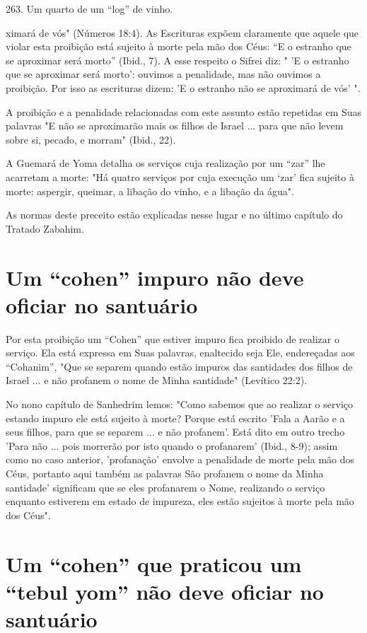 263. Um quarto de um ``log'' de vinho.


ximará de vós" (Números 18:4). As Escrituras expõem claramente que
aquele que violar esta proibição está sujeito à morte pela mão dos Céus:
``E o estranho que se aproximar será morto'' (Ibid., 7). A esse respeito o
Sifrei diz: " 'E o es­tranho que se aproximar será morto': ouvimos a
penalidade, mas não ouvimos a proibição. Por isso as escrituras dizem:
'E o estranho não se aproximará de vós' ".

A proibição e a penalidade relacionadas com este assunto estão
re­petidas em Suas palavras "E não se aproximarão mais os filhos de
Israel ... para que não levem sobre si, pecado, e morram" (Ibid., 22).

A Guemará de Yoma detalha os serviços cuja realização por um ``zar'' lhe
acarretam a morte: "Há quatro serviços por cuja execução um `zar' fica
su­jeito à morte: aspergir, queimar, a libação do vinho, e a libação da
água".

As normas deste preceito estão explicadas nesse lugar e no último
capítulo do Tratado Zabahim.


\section{Um ``cohen'' impuro não deve oficiar no santuário}


Por esta proibição um ``Cohen'' que estiver impuro fica proibido de
realizar o serviço. Ela está expressa em Suas palavras, enaltecido seja
Ele, ende­reçadas aos ``Cohanim'', "Que se separem quando estão impuros
das santida­des dos filhos de Israel ... e não profanem o nome de Minha
santidade" (Levíti­co 22:2).

No nono capítulo de Sanhedrim lemos: "Como sabemos que ao rea­lizar o
serviço estando impuro ele está sujeito à morte? Porque está escrito
'Fa­la a Aarão e a seus filhos, para que se separem ... e não profanem'.
Está dito em outro trecho 'Para não ... pois morrerão por isto quando o
profanarem' (Ibid., 8-9); assim como no caso anterior, 'profanação'
envolve a penalidade de morte pela mão dos Céus, portanto aqui também as
palavras São profanem o nome da Minha santidade' significam que se eles
profanarem o Nome, realizando o serviço enquanto estiverem em estado de
impureza, eles estão sujeitos à morte pela mão dos Céus".

\section{Um ``cohen'' que praticou um ``tebul yom'' não deve oficiar no santuário}

